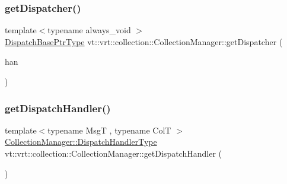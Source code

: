 \subsubsection{\texorpdfstring{get\+Dispatcher()}{getDispatcher()}}
{\footnotesize\ttfamily template$<$typename always\+\_\+void $>$ \\
\hyperlink{namespacevt_1_1vrt_1_1collection_aa3b9731ae16d60fac43d68840f3606a5}{Dispatch\+Base\+Ptr\+Type} vt\+::vrt\+::collection\+::\+Collection\+Manager\+::get\+Dispatcher (\begin{DoxyParamCaption}\item[{\hyperlink{structvt_1_1vrt_1_1collection_1_1_collection_manager_a0cfe02a0426e95ec9daa2ef7374e07c7}{Dispatch\+Handler\+Type} const \&}]{han }\end{DoxyParamCaption})}

\mbox{\label{structvt_1_1vrt_1_1collection_1_1_collection_manager_ab672ad6c3bc9fdc5a9577a9ae0677d1f}} 
\subsubsection{\texorpdfstring{get\+Dispatch\+Handler()}{getDispatchHandler()}}
{\footnotesize\ttfamily template$<$typename MsgT , typename ColT $>$ \\
\hyperlink{structvt_1_1vrt_1_1collection_1_1_collection_manager_a0cfe02a0426e95ec9daa2ef7374e07c7}{Collection\+Manager\+::\+Dispatch\+Handler\+Type} vt\+::vrt\+::collection\+::\+Collection\+Manager\+::get\+Dispatch\+Handler (\begin{DoxyParamCaption}{ }\end{DoxyParamCaption})}

\mbox{\label{structvt_1_1vrt_1_1collection_1_1_collection_manager_ae333912da83d9beac8b710ec98e53094}} 
